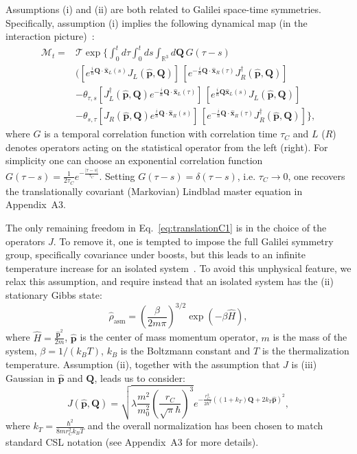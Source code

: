 \documentclass[prl,twocolumn,showpacs,superscriptaddress,groupedaddress]{revtex4}
\begin{document}
Assumptions (i) and (ii) are both related to Galilei space-time symmetries. Specifically, assumption (i) implies the following dynamical map (in the interaction picture)~\cite{gasbarri2017general}:
\begin{align}
\mathcal{M}_{t}=&\mathcal{T}\exp\Big\{\int_{0}^{t}d\tau\int_{0}^{t}ds\int_{\mathbb{R}^3} d \bm{Q} 
\, G(\tau-s)\nonumber\\
&\big(  [e^{\frac{i}{\hbar}\bm{Q}\cdot\hat{\bm{x}}_{L}(s)}J_{L}(\hat{\bm{p}},\bm{Q})]\,[e^{-\frac{i}{\hbar}\bm{Q}\cdot\hat{\bm{x}}_{R}(\tau)}J_{R}^{\dagger}(\hat{\bm{p}},\bm{Q})]\nonumber \\
 & -\theta_{\tau,s}[J_{L}^{\dagger}(\hat{\bm{p}},\bm{Q})e^{-\frac{i}{\hbar}\bm{Q}\cdot\hat{\bm{x}}_{L}(\tau)}]\,[e^{\frac{i}{\hbar}\bm{Q}\hat{\bm{x}}_{L}(s)}J_{L}(\hat{\bm{p}},\bm{Q})]\nonumber \\
 & -\theta_{s,\tau}[J_{R}(\hat{\bm{p}},\bm{Q})e^{\frac{i}{\hbar}\bm{Q}\cdot\hat{\bm{x}}_{R}(s)}]\,[e^{-\frac{i}{\hbar}\bm{Q}\cdot\hat{\bm{x}}_{R}(\tau)}J_{R}^{\dagger}(\hat{\bm{p}},\bm{Q})]\Big\}
,\label{eq:translationC1}
\end{align}
where $G$ is a temporal correlation function with correlation time $\tau_{C}$ and $L$ ($R$) denotes operators acting on the statistical operator from the left (right). For simplicity one can choose an exponential correlation function $G(\tau-s)=\frac{1}{2\tau_C}e^{-\frac{|\tau-s|}{\tau_C}}$. Setting $G(\tau-s)=\delta(\tau-s)$, i.e. $\tau_C \rightarrow 0$, one recovers the translationally covariant (Markovian) Lindblad master equation in Appendix~A3.


The only remaining freedom in Eq.~\eqref{eq:translationC1} is in the choice of the operators $J$. To remove it, one is tempted to impose the full Galilei symmetry group, specifically covariance under boosts, but this leads to an infinite temperature increase for an isolated system~\cite{gasbarri2017general}. To avoid this unphysical feature, we relax this assumption, and require instead that an isolated system has the (ii) stationary Gibbs state:
\begin{equation}
\hat{\rho}_{\text{asm}}=\left(\frac{\beta}{2m\pi}\right)^{3/2}\exp(-\beta\hat{H}),\label{eq:rho_asm}
\end{equation}
where $\hat{H}=\frac{\hat{\bm{p}}^{2}}{2m}$, $\hat{\bm{p}}$ is the center of mass momentum operator, $m$ is the mass of the system, $\beta=1/(k_{B}T)$, $k_{B}$ is the Boltzmann constant and $T$ is the thermalization temperature. Assumption (ii), together with the assumption that $J$ is (iii) Gaussian in $\hat{\bm{p}}$ and $\bm{Q}$, leads us to consider:
\begin{equation}
J(\hat{\bm{p}},\bm{Q})=\sqrt{\lambda\frac{m^{2}}{m_{0}^{2}}\left(\frac{r_{C}}{\sqrt{\pi}\hbar}\right)^{3}}e^{-\frac{r_{C}^{2}}{2\hbar^{2}}((1+k_{T})\bm{Q}+2k_{T}\hat{\bm{p}})^{2}},
\label{eq:JoperatorRe}
\end{equation}
where  $k_T=\frac{\hbar^2}{8 m r_C^2 k_B T}$ and the overall normalization has been chosen to match standard CSL notation (see Appendix~A3 for more details).  
\end{document}
